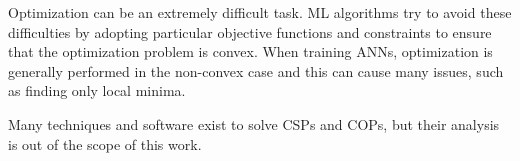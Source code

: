 Optimization can be an extremely difficult task. ML algorithms try to avoid these difficulties by adopting particular objective functions and constraints to ensure that the optimization problem is convex. When training ANNs, optimization is generally performed in the non-convex case and this can cause many issues, such as finding only local minima.

Many techniques and software exist to solve CSPs and COPs, but their analysis is out of the scope of this work.
